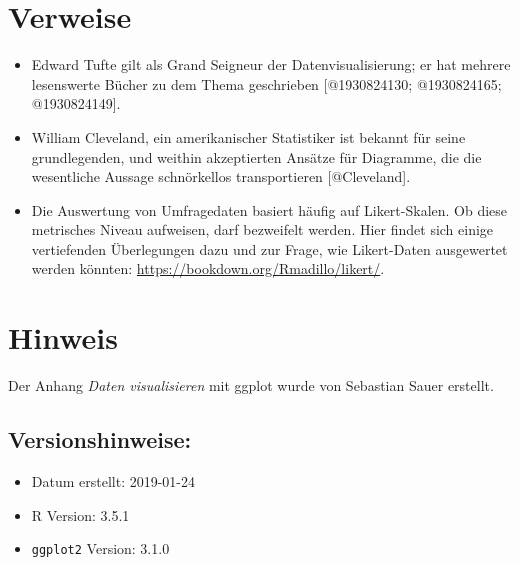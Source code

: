 \documentclass[12pt,ngerman,paper=a4,pagesize,DIV=13]{scrreprt}
\providecommand{\tightlist}{%
  \setlength{\itemsep}{0pt}\setlength{\parskip}{0pt}}
\begin{document}
\hypertarget{verweise-1}{%
\section{Verweise}\label{verweise-1}}

\begin{itemize}
\item
  Edward Tufte gilt als Grand Seigneur der Datenvisualisierung; er hat
  mehrere lesenswerte Bücher zu dem Thema geschrieben {[}@1930824130;
  @1930824165; @1930824149{]}.
\item
  William Cleveland, ein amerikanischer Statistiker ist bekannt für
  seine grundlegenden, und weithin akzeptierten Ansätze für Diagramme,
  die die wesentliche Aussage schnörkellos transportieren
  {[}@Cleveland{]}.
\item
  Die Auswertung von Umfragedaten basiert häufig auf Likert-Skalen. Ob
  diese metrisches Niveau aufweisen, darf bezweifelt werden. Hier findet
  sich einige vertiefenden Überlegungen dazu und zur Frage, wie
  Likert-Daten ausgewertet werden könnten:
  \url{https://bookdown.org/Rmadillo/likert/}.
\end{itemize}

\hypertarget{hinweis-1}{%
\section{Hinweis}\label{hinweis-1}}

Der Anhang \emph{Daten visualisieren} mit ggplot wurde von Sebastian
Sauer erstellt.

\hypertarget{versionshinweise-8}{%
\subsection{Versionshinweise:}\label{versionshinweise-8}}

\begin{itemize}
\tightlist
\item
  Datum erstellt: 2019-01-24
\item
  R Version: 3.5.1
\item
  \texttt{ggplot2} Version: 3.1.0
\end{itemize}
\end{document}
